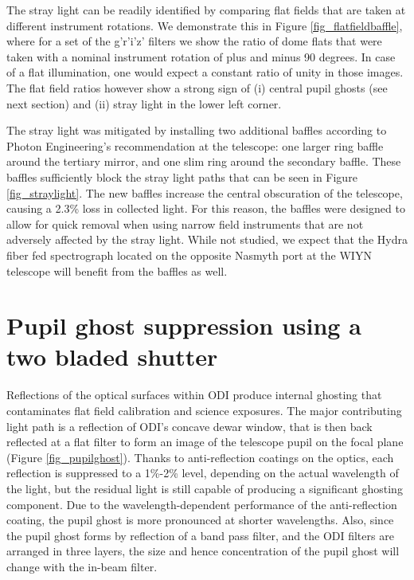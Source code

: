 \documentclass[]{spieman}
\begin{document}
The stray light  can be readily identified by comparing flat fields that are
taken at different instrument rotations. We demonstrate this in Figure
\ref{fig_flatfieldbaffle}, where for a set of the g'r'i'z' filters we show the
ratio of dome flats that were taken with a nominal instrument rotation of plus
and minus 90 degrees.  In case of a flat illumination, one would expect a
constant ratio of unity in those images. The flat field ratios however show a
strong sign of (i) central pupil ghosts (see next section) and (ii) stray light
in the lower left corner.

The stray light was mitigated by installing two additional baffles according to
Photon Engineering's recommendation  at the telescope: one larger ring baffle
around the tertiary mirror, and one slim ring around the secondary baffle. These
baffles sufficiently block the stray light paths that can be seen in Figure
\ref{fig_straylight}. The new baffles increase the central obscuration of the
telescope, causing a 2.3\% loss in collected light. For this reason, the baffles
were designed to allow for quick removal when using narrow field instruments that 
are not adversely affected by the stray light. While not studied, we expect that the Hydra
fiber fed spectrograph located on the opposite Nasmyth port at the WIYN telescope will
benefit from the baffles as well.


\section{Pupil ghost suppression using a two bladed shutter}
\label{sect_ghost}

Reflections of the optical surfaces within ODI produce internal ghosting that
contaminates flat field calibration and science exposures. The major contributing
light path is a reflection of ODI’s concave dewar window, that is then back
reflected at a flat filter to form an image of the telescope pupil on the
focal plane (Figure \ref{fig_pupilghost}).  Thanks to anti-reflection coatings
on the optics, each reflection is suppressed to a 1\%-2\% level,
depending on the actual wavelength of the light, but the residual light is still
capable of producing a significant ghosting component. Due to the
wavelength-dependent performance of the anti-reflection coating, the pupil ghost
is more pronounced at shorter wavelengths. Also, since the pupil ghost forms by
reflection of a band pass filter, and the ODI filters are arranged in three
layers, the size and hence concentration of the pupil ghost will change with the
in-beam filter.
\end{document}

